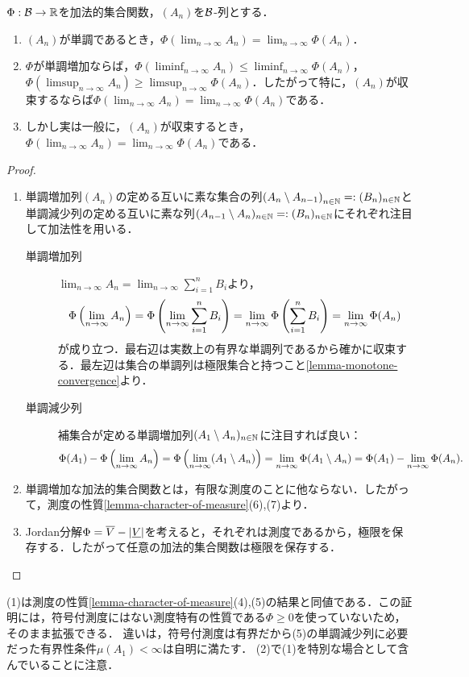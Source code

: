 \documentclass[uplatex, dvipdfmx]{jsreport}
\begin{document}
\begin{proposition}[極限の保存]\label{prop-limits-of-additive-set-function}
    $\Phi:\mathcal{B}\to\mathbb{R}$を加法的集合関数，$(A_n)$を$\mathcal{B}$-列とする．
    \begin{enumerate}
        \item $(A_n)$が単調であるとき，$\Phi(\lim_{n\to\infty}A_n)=\lim_{n\to\infty}\Phi(A_n)$．
        \item $\Phi$が単調増加ならば，$\Phi(\liminf_{n\to\infty}A_n)\le\liminf_{n\to\infty}\Phi(A_n)$，$\Phi(\limsup_{n\to\infty}A_n)\ge\limsup_{n\to\infty}\Phi(A_n)$．したがって特に，$(A_n)$が収束するならば$\Phi(\lim_{n\to\infty}A_n)=\lim_{n\to\infty}\Phi(A_n)$である．
        \item しかし実は一般に，$(A_n)$が収束するとき，$\Phi(\lim_{n\to\infty}A_n)=\lim_{n\to\infty}\Phi(A_n)$である．
    \end{enumerate}
\end{proposition}
\begin{proof}\mbox{}
    \begin{enumerate}
        \item 単調増加列$(A_n)$の定める互いに素な集合の列$\left(A_n\setminus A_{n-1}\right)_{n\in\mathbb{N}}=:(B_n)_{n\in\mathbb{N}}$と単調減少列の定める互いに素な列$(A_{n-1}\setminus A_{n})_{n\in\mathbb{N}}=:(B_n)_{n\in\mathbb{N}}$にそれぞれ注目して加法性を用いる．
        \begin{description}
            \item[単調増加列] $\lim_{n\to\infty}A_n=\lim_{n\to\infty}\sum^n_{i=1}B_i$より，
            \[\Phi\left(\lim_{n\to\infty}A_n\right)=\Phi\left(\lim_{n\to\infty}\sum^n_{i=1}B_i\right)=\lim_{n\to\infty}\Phi\left(\sum^n_{i=1}B_i\right)=\lim_{n\to\infty}\Phi(A_n)\]
            が成り立つ．最右辺は実数上の有界な単調列であるから確かに収束する．最左辺は集合の単調列は極限集合と持つこと\ref{lemma-monotone-convergence}より．
            \item[単調減少列] 
            補集合が定める単調増加列$(A_1\setminus A_n)_{n\in\mathbb{N}}$に注目すれば良い：
            \[\Phi(A_1)-\Phi\left(\lim_{n\to\infty}A_n\right)=\Phi\left(\lim_{n\to\infty}(A_1\setminus A_n)\right)=\lim_{n\to\infty}\Phi(A_1\setminus A_n)=\Phi(A_1)-\lim_{n\to\infty}\Phi(A_n).\]
        \end{description}
        \item 単調増加な加法的集合関数とは，有限な測度のことに他ならない．したがって，測度の性質\ref{lemma-character-of-measure}(6),(7)より．
        \item Jordan分解$\Phi=\overline{V}-\lvert\underline{V}\rvert$を考えると，それぞれは測度であるから，極限を保存する．したがって任意の加法的集合関数は極限を保存する．
    \end{enumerate}
\end{proof}
\begin{remarks}
    (1)は測度の性質\ref{lemma-character-of-measure}(4),(5)の結果と同値である．この証明には，符号付測度にはない測度特有の性質である$\Phi\ge 0$を使っていないため，そのまま拡張できる．
    違いは，符号付測度は有界だから(5)の単調減少列に必要だった有界性条件$\mu(A_1)<\infty$は自明に満たす．
    (2)で(1)を特別な場合として含んでいることに注意．
\end{remarks}
\end{document}
